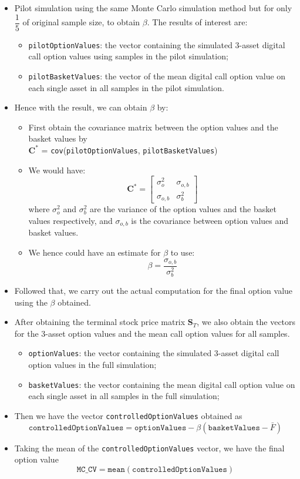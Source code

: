 \begin{itemize}
	\item Pilot simulation using the same Monte Carlo simulation method but for only $\dfrac{1}{5}$ of original sample size, to obtain $\beta$. The results of interest are:
	\begin{itemize}
	\item \texttt{pilotOptionValues}: the vector containing the simulated 3-asset digital call option values using samples in the pilot simulation; 
	\item \texttt{pilotBasketValues}: the vector of the mean digital call option value on each single asset in all samples in the pilot simulation.
	\end{itemize}
	\item Hence with the result, we can obtain $\beta$ by:
	\begin{itemize}
		\item First obtain the covariance matrix between the option values and the basket values by \\ \vspace{1mm} $\mathbf{C^{*}}$ = \texttt{cov}(\texttt{pilotOptionValues}, \texttt{pilotBasketValues})
		\item We would have:
	  \[\mathbf{C^{*}} =\begin{bmatrix}
		\sigma_{o}^2 & \sigma_{o,b} \\
		\sigma_{o,b} & \sigma_{b}^2
		\end{bmatrix} \]
		where $\sigma_{o}^2$ and $\sigma_{b}^2$ are the variance of the option values and the basket values respectively, and $\sigma_{o,b}$ is the covariance between option values and basket values.
		\item We hence could have an estimate for $\beta$ to use: $$\beta = \dfrac{\sigma_{o,b}}{\sigma_{b}^2}$$
	\end{itemize}
	\item Followed that, we carry out the actual computation for the final option value using the $\beta$ obtained.
	\item After obtaining the terminal stock price matrix $\mathbf{S}_T$, we also obtain the vectors for the 3-asset option values and the mean call option values for all samples.
	\begin{itemize}
		\item \texttt{optionValues}: the vector containing the simulated 3-asset digital call option values in the full simulation;
		\item \texttt{basketValues}: the vector containing the mean digital call option value on each single asset in all samples in the full simulation;
	\end{itemize}
	\item Then we have the vector \texttt{controlledOptionValues} obtained as $$\texttt{controlledOptionValues} = \texttt{optionValues} - \beta(\texttt{basketValues} - \bar{F})$$
	\item Taking the mean of the \texttt{controlledOptionValues} vector, we have the final option value $$\texttt{MC\_CV} = \texttt{mean}(\texttt{controlledOptionValues})$$
\end{itemize}

